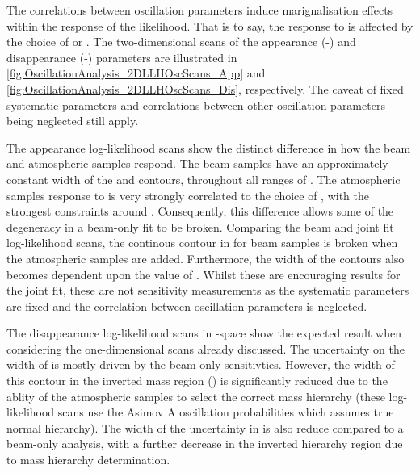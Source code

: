 The correlations between oscillation parameters induce marignalisation effects within the response of the likelihood. That is to say, the response to \dcp is affected by the choice of \sinsqreac or \sinsqatm. The two-dimensional scans of the appearance (\sinsqreac-\dcp) and disappearance (\sinsqatm-\delmsqatm) parameters are illustrated in \autoref{fig:OscillationAnalysis_2DLLHOscScans_App} and \autoref{fig:OscillationAnalysis_2DLLHOscScans_Dis}, respectively. The caveat of fixed systematic parameters and correlations between other oscillation parameters being neglected still apply.

The appearance log-likelihood scans show the distinct difference in how the beam and atmospheric samples respond. The beam samples have an approximately constant width of the \quickmath{2\sigma} and \quickmath{3\sigma} contours, throughout all ranges of \dcp. The atmospheric samples response to \dcp is very strongly correlated to the choice of \sinsqreac, with the strongest constraints around . Consequently, this difference allows some of the degeneracy in a beam-only fit to be broken. Comparing the beam and joint fit log-likelihood scans, the \quickmath{2\sigma} continous contour in \dcp for beam samples is broken when the atmospheric samples are added. Furthermore, the width of the \quickmath{3\sigma} contours also becomes dependent upon the value of \dcp. Whilst these are encouraging results for the joint fit, these are not sensitivity measurements as the systematic parameters are fixed and the correlation between oscillation parameters is neglected.

The disappearance log-likelihood scans in \sinsqatm-\delmsqatm space show the expected result when considering the one-dimensional scans already discussed. The uncertainty on the width of  is mostly driven by the beam-only sensitivties. However, the width of this contour in the inverted mass region () is significantly reduced due to the ablity of the atmospheric samples to select the correct mass hierarchy (these log-likelihood scans use the Asimov A oscillation probabilities which assumes true normal hierarchy). The width of the uncertainty in \sinsqatm is also reduce compared to a beam-only analysis, with a further decrease in the inverted hierarchy region due to mass hierarchy determination.

